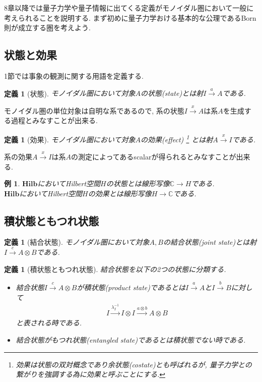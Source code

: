 \documentclass[a4paper,12pt]{ltjsarticle}
\theoremstyle{break}
\newtheorem{defn}[thm]{定義}
\newtheorem{eg}[thm]{例}
\newcommand{\hilb}{\mathbf{Hilb}}
\newcommand{\mbc}{\mathbb{C}}
\newcommand{\xr}[1]{\xrightarrow{#1}}
\newcommand{\la}{\lambda}
\newcommand{\ot}{\otimes}
\numberwithin{equation}{section}
\begin{document}
8章以降では量子力学や量子情報に出てくる定義がモノイダル圏において一般に考えられることを説明する. 
まず初めに量子力学おける基本的な公理であるBorn則が成立する圏を考えよう. 

\subsection{状態と効果}

1節では事象の観測に関する用語を定義する. 

\begin{defn}[状態]
  モノイダル圏において対象$A$の状態(state)とは射$I \xr{a} A$である. 
\end{defn} 

モノイダル圏の単位対象は自明な系であるので, 系の状態$I \xr{x} A$は系$A$を生成する過程とみなすことが出来る. 

\begin{defn}[効果]
  モノイダル圏において対象$A$の効果(effect)
  \footnote{
    効果は状態の双対概念であり余状態(costate)とも呼ばれるが, 量子力学との繋がりを強調する為に効果と呼ぶことにする.
    }
  とは射$A \xr{x} I$である. 
\end{defn}  

系の効果$A \xr{x} I$は系$A$の測定によってあるscalarが得られるとみなすことが出来る. 

\begin{eg}
  $\hilb$においてHilbert空間$H$の状態とは線形写像$\mbc \to H$である. \\ 
  $\hilb$においてHilbert空間$H$の効果とは線形写像$H \to \mbc$である. 
\end{eg}

\subsection{積状態ともつれ状態}

\begin{defn}[結合状態]
  モノイダル圏において対象$A,B$の結合状態(joint state)とは射$I \xr{c} A \ot B$である. 
\end{defn}  

\begin{defn}[積状態ともつれ状態]
  結合状態を以下の2つの状態に分類する. 
  \begin{itemize}
    \item 結合状態$I \xr{c} A \ot B$が積状態(product state)であるとは$I \xr{a} A$と$I \xr{b} B$に対して
    \begin{align*}
      I \xr{\la_I^{-1}} I \ot I \xr{a \ot b} A \ot B
    \end{align*}
    と表される時である. 
    \item 結合状態がもつれ状態(entangled state)であるとは積状態でない時である.  
  \end{itemize}  
\end{defn}
\end{document}
